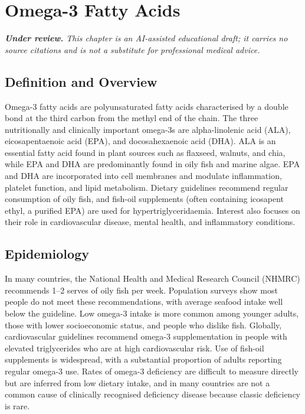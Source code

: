 \chapter{Omega-3 Fatty Acids}

\medskip
\noindent\textit{\textbf{Under review.} This chapter is an AI-assisted educational draft; it carries no source citations and is not a substitute for professional medical advice.}

\section*{Definition and Overview}
Omega-3 fatty acids are polyunsaturated fatty acids characterised by a double bond at the third carbon from the methyl end of the chain. The three nutritionally and clinically important omega-3s are alpha-linolenic acid (ALA), eicosapentaenoic acid (EPA), and docosahexaenoic acid (DHA). ALA is an essential fatty acid found in plant sources such as flaxseed, walnuts, and chia, while EPA and DHA are predominantly found in oily fish and marine algae. EPA and DHA are incorporated into cell membranes and modulate inflammation, platelet function, and lipid metabolism. Dietary guidelines recommend regular consumption of oily fish, and fish-oil supplements (often containing icosapent ethyl, a purified EPA) are used for hypertriglyceridaemia. Interest also focuses on their role in cardiovascular disease, mental health, and inflammatory conditions.

\section*{Epidemiology}
In many countries, the National Health and Medical Research Council (NHMRC) recommends 1--2 serves of oily fish per week. Population surveys show most people do not meet these recommendations, with average seafood intake well below the guideline. Low omega-3 intake is more common among younger adults, those with lower socioeconomic status, and people who dislike fish. Globally, cardiovascular guidelines recommend omega-3 supplementation in people with elevated triglycerides who are at high cardiovascular risk. Use of fish-oil supplements is widespread, with a substantial proportion of adults reporting regular omega-3 use. Rates of omega-3 deficiency are difficult to measure directly but are inferred from low dietary intake, and in many countries are not a common cause of clinically recognised deficiency disease because classic deficiency is rare.

